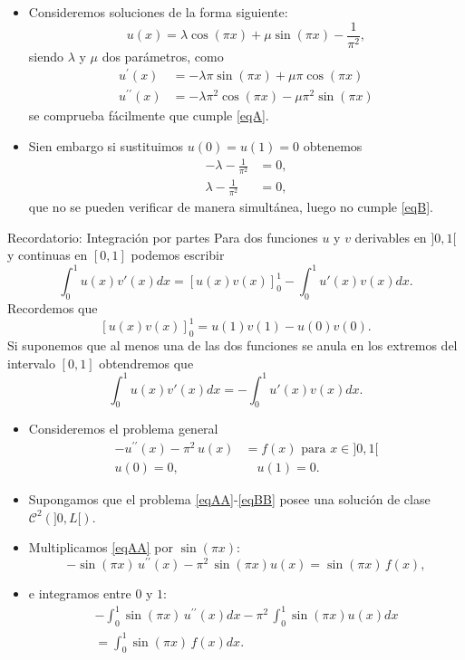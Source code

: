 \documentclass[10pt,handout]{beamer}
\theoremstyle{plain} %
\theoremstyle{plain} %
\theoremstyle{plain} %
\theoremstyle{plain} %
\theoremstyle{definition}
\theoremstyle{example}
\theoremstyle{example}
\theoremstyle{remark}
\theoremstyle{remark}
\begin{document}
\begin{frame}
\begin{itemize}
\item Consideremos soluciones de la forma siguiente:
$$
u(x) = \lambda \cos(\pi x) + \mu \sin(\pi x) - \frac{1}{\pi^2},
$$
siendo $\lambda$ y $\mu$ dos parámetros, como
\begin{align*}
u^{\prime}(x) & =  - \lambda \pi \sin(\pi x) + \mu \pi \cos(\pi x) \\ 
u^{\prime \prime}(x) & =  - \lambda \pi^2 \cos(\pi x) - \mu \pi^2 \sin(\pi x) 
\end{align*}
se comprueba fácilmente que cumple \eqref{eqA}.
\item Sien embargo si sustituimos $u(0)=u(1) =0$ obtenemos
\begin{align*}
-\lambda - \frac{1}{\pi^2} & = 0, \\ 
\lambda - \frac{1}{\pi^2} & = 0,
\end{align*}
que no se pueden verificar de manera simultánea, luego no cumple \eqref{eqB}.
\end{itemize}
\end{frame}

\begin{frame}
\begin{block}{Recordatorio: Integración por partes}
Para dos funciones $u$ y $v$ derivables en $]0,1[$ y continuas en $[0,1]$ podemos
escribir
$$
\int_0^1 u(x)v'(x)dx = \left[u(x)v(x)\right]_0^1 - \int_0^1 u'(x)v(x)dx.
$$
Recordemos que
$$
\left[u(x)v(x)\right]_0^1 = u(1)v(1)-u(0)v(0).
$$
Si suponemos que al menos una de las dos funciones se anula en los extremos del intervalo $[0,1]$
obtendremos que
$$
\int_0^1 u(x)v'(x)dx = - \int_0^1 u'(x)v(x)dx.
$$
\end{block}
\end{frame}

\begin{frame}
\begin{itemize}
\item Consideremos el problema general
\begin{align}
-u^{\prime  \prime }(x) - \pi^2 \,u(x) & = f(x) \text{ para } x \in ]0,1[ \label{eqAA} \\
u(0)=0, & \quad u(1)=0. \label{eqBB}
\end{align}
\item Supongamos que el problema \eqref{eqAA}-\eqref{eqBB} posee una solución de clase
$\mathcal{C}^2(]0,L[).$
\item Multiplicamos \eqref{eqAA} por $\sin(\pi x):$
$$
-\sin(\pi x) \, u^{\prime \prime}(x)   - \pi^2 \, \sin(\pi x) u(x)  = \sin(\pi x)\, f(x),
$$
\item e integramos entre $0$ y $1:$
\begin{align*}
- \int_0^1 \sin(\pi x) \, u^{\prime \prime}(x) dx  - \pi^2 \, \int_0^1 \sin(\pi x) u(x) dx  \\ = \int_0^1 \sin(\pi x)\, f(x) dx.
\end{align*}
\end{itemize}
\end{frame}
\end{document}
